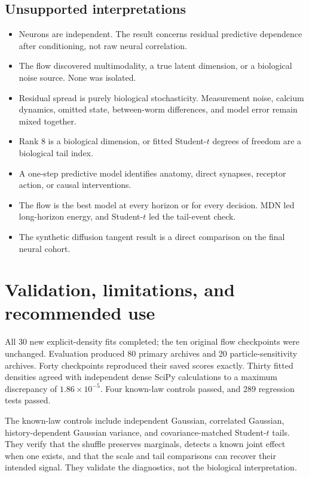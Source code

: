 \documentclass[11pt]{article}
\begin{document}
\subsection*{Unsupported interpretations}
\begin{itemize}
  \item Neurons are independent. The result concerns residual predictive dependence after conditioning, not raw neural correlation.
  \item The flow discovered multimodality, a true latent dimension, or a biological noise source. None was isolated.
  \item Residual spread is purely biological stochasticity. Measurement noise, calcium dynamics, omitted state, between-worm differences, and model error remain mixed together.
  \item Rank 8 is a biological dimension, or fitted Student-$t$ degrees of freedom are a biological tail index.
  \item A one-step predictive model identifies anatomy, direct synapses, receptor action, or causal interventions.
  \item The flow is the best model at every horizon or for every decision. MDN led long-horizon energy, and Student-$t$ led the tail-event check.
  \item The synthetic diffusion tangent result is a direct comparison on the final neural cohort.
\end{itemize}

\section{Validation, limitations, and recommended use}

All 30 new explicit-density fits completed; the ten original flow checkpoints were unchanged. Evaluation produced 80 primary archives and 20 particle-sensitivity archives. Forty checkpoints reproduced their saved scores exactly. Thirty fitted densities agreed with independent dense SciPy calculations to a maximum discrepancy of $1.86\times10^{-5}$. Four known-law controls passed, and 289 regression tests passed.

The known-law controls include independent Gaussian, correlated Gaussian, history-dependent Gaussian variance, and covariance-matched Student-$t$ tails. They verify that the shuffle preserves marginals, detects a known joint effect when one exists, and that the scale and tail comparisons can recover their intended signal. They validate the diagnostics, not the biological interpretation.
\end{document}
